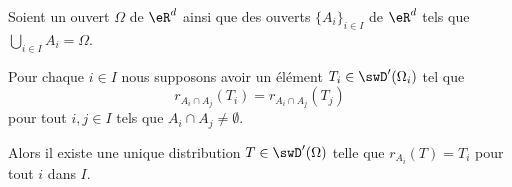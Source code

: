 \begin{proposition}		\label{PROPooDVYNooKquEUl}
	Soient un ouvert \( \Omega\) de \( \eR^d\) ainsi que des ouverts \( \{ A_i \}_{i\in I}\) de \( \eR^d\) tels que \( \bigcup_{i\in I}A_i=\Omega\).

	Pour chaque \( i\in I\) nous supposons avoir un élément \( T_i\in\swD'(\Omega_i)\) tel que
	\begin{equation}
		r_{A_i\cap A_j}(T_i)=r_{A_i\cap A_j}(T_j)
	\end{equation}
	pour tout \( i,j\in I\) tels que \( A_i\cap A_j\neq \emptyset\).

	Alors il existe une unique distribution \( T\in \swD'(\Omega)\) telle que \( r_{A_i}(T)=T_i\) pour tout \( i\) dans \( I\).
\end{proposition}

